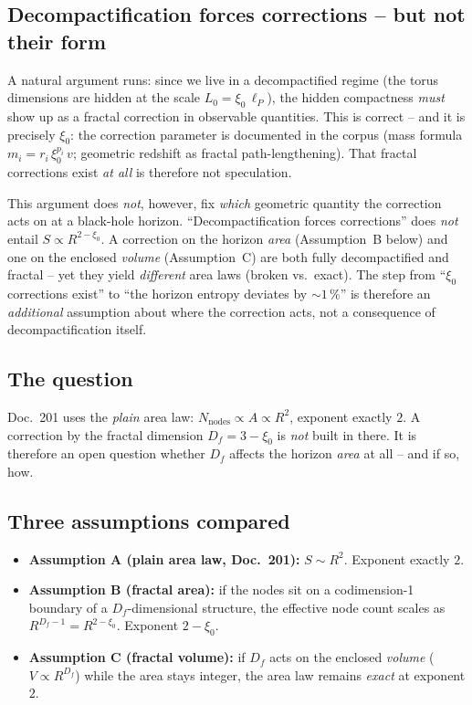 \subsection*{Decompactification forces corrections -- but not their form}

A natural argument runs: since we live in a decompactified regime (the torus
dimensions are hidden at the scale $L_0 = \xi_0\,\ell_P$), the hidden
compactness \emph{must} show up as a fractal correction in observable
quantities. This is correct -- and it is precisely $\xi_0$: the correction
parameter is documented in the corpus (mass formula $m_i =
r_i\,\xi_0^{p_i}\,v$; geometric redshift as fractal path-lengthening). That
fractal corrections exist \emph{at all} is therefore not speculation.

\medskip

\noindent
This argument does \emph{not}, however, fix \emph{which} geometric quantity
the correction acts on at a black-hole horizon. \enquote{Decompactification
forces corrections} does \emph{not} entail $S \propto R^{2-\xi_0}$. A
correction on the horizon \emph{area} (Assumption~B below) and one on the
enclosed \emph{volume} (Assumption~C) are both fully decompactified and
fractal -- yet they yield \emph{different} area laws (broken vs.\ exact). The
step from \enquote{$\xi_0$ corrections exist} to \enquote{the horizon entropy
deviates by ${\sim}1\,\%$} is therefore an \emph{additional} assumption about
where the correction acts, not a consequence of decompactification itself.

\subsection*{The question}

Doc.~201 uses the \emph{plain} area law: $N_{\text{nodes}} \propto A \propto
R^2$, exponent exactly $2$. A correction by the fractal dimension $D_f = 3 -
\xi_0$ is \emph{not} built in there. It is therefore an open question whether
$D_f$ affects the horizon \emph{area} at all -- and if so, how.

\subsection*{Three assumptions compared}

\begin{itemize}
  \item \textbf{Assumption A (plain area law, Doc.~201):}
        $S \sim R^{2}$. Exponent exactly $2$.
  \item \textbf{Assumption B (fractal area):} if the nodes sit on a
        codimension-1 boundary of a $D_f$-dimensional structure, the
        effective node count scales as $R^{D_f - 1} = R^{2-\xi_0}$.
        Exponent $2 - \xi_0$.
  \item \textbf{Assumption C (fractal volume):} if $D_f$ acts on the enclosed
        \emph{volume} ($V \propto R^{D_f}$) while the area stays integer, the
        area law remains \emph{exact} at exponent $2$.
\end{itemize}

